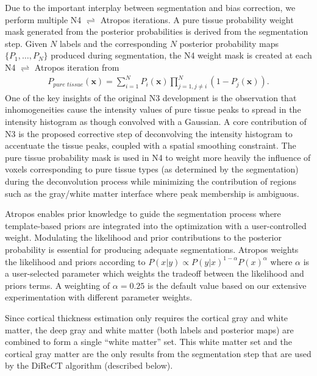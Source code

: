 Due to the important interplay between segmentation and bias correction,
we perform multiple N4 $\rightleftharpoons$ Atropos iterations.
A pure tissue probability weight mask generated from the 
posterior probabilities is derived from the segmentation 
step.  Given $N$ labels and the corresponding $N$
posterior probability maps $\{ P_1, \ldots, P_N\}$ produced
during segmentation, the N4 weight mask is 
created at each N4 $\rightleftharpoons$ Atropos iteration from
\begin{align}
  P_{pure\,\,tissue}(\mathbf{x}) = \sum_{i=1}^N P_i(\mathbf{x}) \prod_{j=1, j \neq i}^N \left( 1 - P_j(\mathbf{x}) \right).
\end{align}
One of the key insights of the original N3 development is the
observation that inhomogeneities cause the intensity values of
pure tissue peaks to spread in the intensity histogram as though
convolved with a Gaussian.  A core contribution of N3 is the
proposed corrective step of deconvolving the intensity histogram to
accentuate the tissue peaks, coupled with a spatial smoothing
constraint. The pure tissue probability mask is used in N4 to weight
more heavily the influence of voxels corresponding to pure tissue 
types (as determined by the segmentation) during the deconvolution process 
while minimizing the contribution of regions such as the gray/white matter 
interface where peak membership is ambiguous. 

Atropos enables prior knowledge to guide the
segmentation process where template-based priors are integrated into the optimization
with a user-controlled weight.  Modulating the likelihood and prior contributions
to the posterior probability is essential for producing adequate segmentations.
Atropos weights the likelihood and priors according to
$P(x|y) \propto P(y|x)^{1-\alpha}P(x)^{\alpha}$
where $\alpha$ is a user-selected parameter which weights the tradeoff between the likelihood and priors terms.  A weighting of $\alpha = 0.25$ is the default value based 
on our extensive experimentation with different parameter weights.


Since cortical thickness estimation only requires the cortical gray
and white matter, the deep gray and white matter
(both labels and posterior maps) are combined to form a single
``white matter'' set.  This white matter set and the cortical
gray matter are the only results from the segmentation
step that are used by the DiReCT algorithm (described below).

